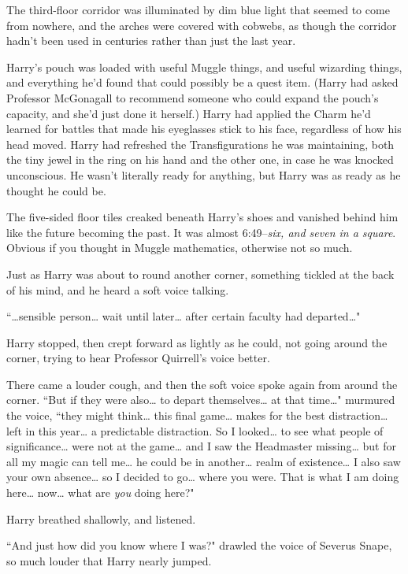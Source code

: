 The third-floor corridor was illuminated by dim blue light that seemed to come from nowhere, and the arches were covered with cobwebs, as though the corridor hadn't been used in centuries rather than just the last year.

Harry's pouch was loaded with useful Muggle things, and useful wizarding things, and everything he'd found that could possibly be a quest item. (Harry had asked Professor McGonagall to recommend someone who could expand the pouch's capacity, and she'd just done it herself.) Harry had applied the Charm he'd learned for battles that made his eyeglasses stick to his face, regardless of how his head moved. Harry had refreshed the Transfigurations he was maintaining, both the tiny jewel in the ring on his hand and the other one, in case he was knocked unconscious. He wasn't literally ready for anything, but Harry was as ready as he thought he could be.

The five-sided floor tiles creaked beneath Harry's shoes and vanished behind him like the future becoming the past. It was almost 6:49\---\emph{six, and seven in a square}. Obvious if you thought in Muggle mathematics, otherwise not so much.

Just as Harry was about to round another corner, something tickled at the back of his mind, and he heard a soft voice talking.

``{\ldots}sensible person{\ldots} wait until later{\ldots} after certain faculty had departed{\ldots}"

Harry stopped, then crept forward as lightly as he could, not going around the corner, trying to hear Professor Quirrell's voice better.

There came a louder cough, and then the soft voice spoke again from around the corner. ``But if they were also{\ldots} to depart themselves{\ldots} at that time{\ldots}" murmured the voice, ``they might think{\ldots} this final game{\ldots} makes for the best distraction{\ldots} left in this year{\ldots} a predictable distraction. So I looked{\ldots} to see what people of significance{\ldots} were not at the game{\ldots} and I saw the Headmaster missing{\ldots} but for all my magic can tell me{\ldots} he could be in another{\ldots} realm of existence{\ldots} I also saw your own absence{\ldots} so I decided to go{\ldots} where you were. That is what I am doing here{\ldots} now{\ldots} what are \emph{you} doing here?"

Harry breathed shallowly, and listened.

``And just how did you know where I was?" drawled the voice of Severus Snape, so much louder that Harry nearly jumped.

